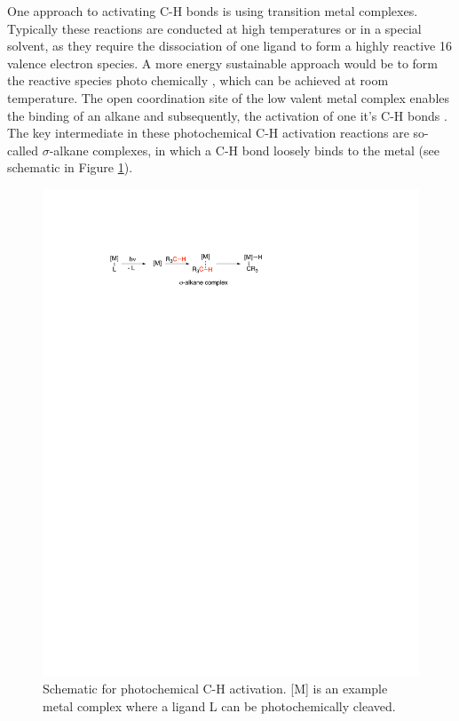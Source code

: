 One approach to activating C-H bonds is using transition metal complexes. Typically these reactions are conducted at high temperatures or in a special solvent, as they require the dissociation of one ligand to form a highly reactive 16 valence electron species. A more energy sustainable approach would be to form the reactive species photo chemically \cite{arndtsen1995selective, Hartwig_book}, which can be achieved at room temperature. The open coordination site of the low valent metal complex enables the binding of an alkane \cite{hall1992matrix, jones2003isotope, crabtree1988hh, altus2021continuum} and subsequently, the activation of one it's C-H bonds \cite{hammarback2021direct, lian1996femtosecond, bromberg1996ultrafast, bromberg1997mechanism}. The key intermediate in these photochemical C-H activation reactions are so-called $\sigma$-alkane complexes, in which a C-H bond loosely binds to the metal (see schematic in Figure \ref{fig:scheme_photochem_C_H}).
\begin{figure}[H]
    \centering
    \includegraphics[width=0.8\linewidth]{Figures/Transition_Metal_Catalysis.pdf}
    \caption{Schematic for photochemical C-H activation. [M] is an example metal complex where a ligand L can be photochemically cleaved.}
    \label{fig:scheme_photochem_C_H}
\end{figure}
